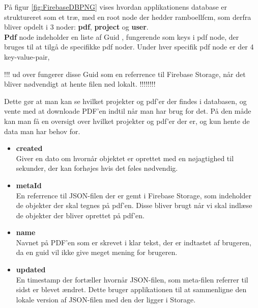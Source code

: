 På figur \ref{fig:FirebaseDBPNG} vises hvordan applikationens database er struktureret som et træ, med en root node\cite{rootNode} der hedder ramboellfcm, som derfra bliver opdelt i 3 noder:
\textbf{pdf}, \textbf{project} og \textbf{user}.\\

\textbf{Pdf} node indeholder en liste af Guid \cite{GUID}, fungerende som keys i pdf node, der bruges til at tilgå de specifikke pdf noder. Under hver specifik pdf node er der 4 key-value-pair\cite{KVP}, 

!!! ud over fungerer disse Guid som en referrence til Firebase Storage, når det bliver nødvendigt at hente filen ned lokalt.  !!!!!!!!

Dette gør at man kan se hvilket projekter og pdf'er der findes i databasen, og vente med at downloade PDF'en indtil når man har brug for det. På den måde kan man få en oversigt over hvilket projekter og pdf'er der er, og kun hente de data man har behov for. 
\begin{itemize}
	\item \textbf{created}\\
	Giver en dato om hvornår objektet er oprettet med en nøjagtighed til sekunder, der kan forhøjes hvis det føles nødvendig.\\
	\item \textbf{metaId}\\
	En referrence til JSON-filen der er gemt i Firebase Storage\cite{FirebaseStorage}, som indeholder de objekter der skal tegnes på pdf'en. Disse bliver brugt når vi skal indlæse de objekter der bliver oprettet på pdf'en.\\ 
	
	\item \textbf{name}\\
	Navnet på PDF'en som er skrevet i klar tekst, der er indtastet af brugeren, da en guid vil ikke give meget mening for brugeren.\\
	
	\item \textbf{updated}\\
	En timestamp der fortæller hvornår JSON-filen, som meta-filen referrer til sidst er blevet ændret. Dette bruger applikationen til at sammenligne den lokale version af JSON-filen med den der ligger i Storage.   
\end{itemize}


